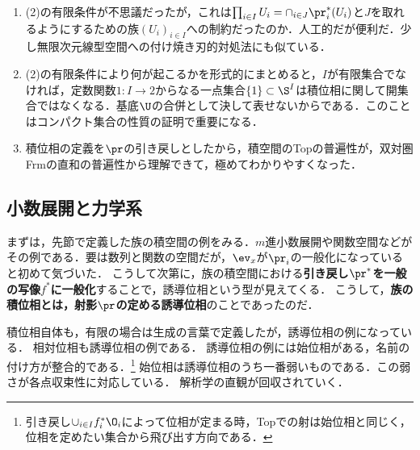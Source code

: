 \documentclass[uplatex,dvipdfmx]{jsreport}
\begin{document}
\begin{remark}\mbox{}
    \begin{enumerate}
        \item (2)の有限条件が不思議だったが，これは$\prod_{i\in I}U_i=\cap_{i\in J}\pr^*_i(U_i)$と$J$を取れるようにするための族$(U_i)_{i\in I}$への制約だったのか．人工的だが便利だ．少し無限次元線型空間への付け焼き刃的対処法にも似ている．
        \item (2)の有限条件により何が起こるかを形式的にまとめると，$I$が有限集合でなければ，定数関数$1:I\to 2$からなる一点集合$\{1\}\subset\S^I$は積位相に関して開集合ではなくなる．基底$\U$の合併として決して表せないからである．このことはコンパクト集合の性質の証明で重要になる．
        \item 積位相の定義を$\pr$の引き戻しとしたから，積空間のTopの普遍性が，双対圏Frmの直和の普遍性から理解できて，極めてわかりやすくなった．
    \end{enumerate}
\end{remark}

\subsection{小数展開と力学系}

\begin{screen}
    まずは，先節で定義した族の積空間の例をみる．$m$進小数展開や関数空間などがその例である．要は数列と関数の空間だが，$\ev_x$が$\pr_i$の一般化になっていると初めて気づいた．
    こうして次第に，族の積空間における\textbf{引き戻し$\pr^*$を一般の写像$f^*$に一般化}することで，誘導位相という型が見えてくる．
    こうして，\textbf{族の積位相とは，射影$\pr$の定める誘導位相}のことであったのだ．

    積位相自体も，有限の場合は生成の言葉で定義したが，誘導位相の例になっている．
    相対位相も誘導位相の例である．
    誘導位相の例には始位相がある，名前の付け方が整合的である．\footnote{引き戻し$\cup_{i\in I}f^*_i\O_i$によって位相が定まる時，Topでの射は始位相と同じく，位相を定めたい集合から飛び出す方向である．}
    始位相は誘導位相のうち一番弱いものである．この弱さが各点収束性に対応している．
    解析学の直観が回収されていく．
\end{screen}
\end{document}
